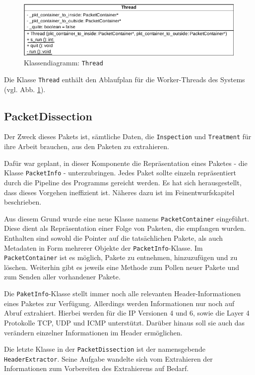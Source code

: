\documentclass[../review_3.tex]{subfiles}
\begin{document}
\begin{figure}[h]
    \centering
    \includegraphics[width=0.85\linewidth]{img/Thread.pdf}
    \caption{Klassendiagramm: \texttt{Thread}}
    \label{thread}
\end{figure}
Die Klasse \texttt{Thread} enthält den Ablaufplan für die Worker-Threads des Systems (vgl. Abb. \ref{thread}).

\subsection{PacketDissection}
Der  Zweck dieses Pakets ist, sämtliche Daten, die \texttt{Inspection} und \texttt{Treatment} für ihre Arbeit brauchen, aus den Paketen zu extrahieren.

Dafür war geplant, in dieser Komponente die Repräsentation eines Paketes - die Klasse \texttt{PacketInfo} - unterzubringen. Jedes Paket sollte einzeln repräsentiert durch die Pipeline des Programms gereicht werden. Es hat sich herausgestellt, dass dieses Vorgehen ineffizient ist. Näheres dazu ist im Feinentwurfskapitel beschrieben.

Aus diesem Grund wurde eine neue Klasse namens \texttt{PacketContainer} eingeführt. Diese dient als Repräsentation einer Folge von Paketen, die empfangen wurden. Enthalten sind sowohl die Pointer auf die tatsächlichen Pakete, als auch Metadaten in Form mehrerer Objekte der \texttt{PacketInfo}-Klasse. Im \texttt{PacketContainer} ist es möglich, Pakete zu entnehmen, hinzuzufügen und zu löschen. Weiterhin gibt es jeweils eine Methode zum Pollen neuer Pakete und zum Senden aller vorhandener Pakete.

Die \texttt{PaketInfo}-Klasse stellt immer noch alle relevanten Header-Informationen eines Paketes zur Verfügung. Allerdings werden Informationen nur noch auf Abruf extrahiert. Hierbei werden für die IP Versionen 4 und 6, sowie die Layer 4 Protokolle TCP, UDP und ICMP unterstützt. Darüber hinaus soll sie auch das verändern einzelner Informationen im Header ermöglichen.

Die letzte Klasse in der \texttt{PacketDissection} ist der namensgebende \texttt{HeaderExtractor}. Seine Aufgabe wandelte sich vom Extrahieren der Informationen zum Vorbereiten des Extrahierens auf Bedarf.
\end{document}
